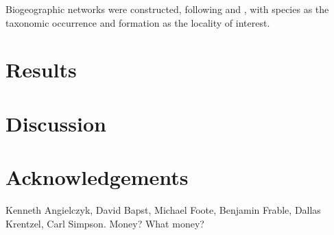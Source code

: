 \documentclass[12pt,letterpaper]{article}
\begin{document}
Biogeographic networks were constructed, following \citet{Sidor2013} and \citet{Vilhena2013}, with species as the taxonomic occurrence and formation as the locality of interest.

%
%
%


\section{Results}


\section{Discussion}


\section*{Acknowledgements}
Kenneth Angielczyk, David Bapst, Michael Foote, Benjamin Frable, Dallas Krentzel, Carl Simpson. Money? What money?



\end{document}

